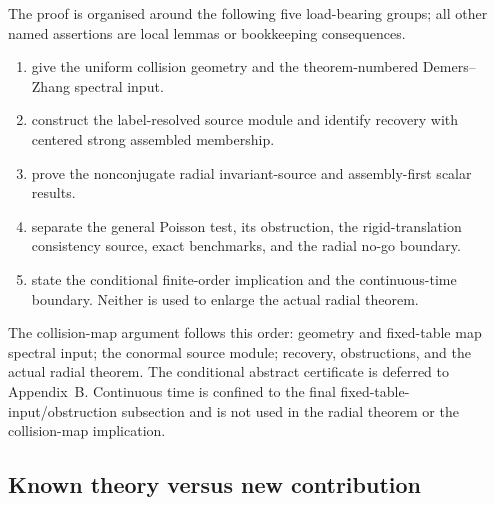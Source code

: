 \documentclass[11pt]{amsart}
\theoremstyle{compactplain}
\theoremstyle{compactdefinition}
\theoremstyle{compactremark}
\begin{document}
The proof is organised around the following five load-bearing groups;
all other named assertions are local lemmas or bookkeeping consequences.
\begin{enumerate}[label=\textup{\arabic*.},wide,labelindent=0pt]
  \item {}
  give the uniform collision geometry and the theorem-numbered
  Demers--Zhang spectral input.
  \item {}
  construct the label-resolved source module
  and identify recovery with centered strong assembled membership.
  \item {}
  prove the nonconjugate radial
  invariant-source and assembly-first scalar results.
  \item {}
  separate the general Poisson
  test, its obstruction, the rigid-translation consistency source, exact
  benchmarks, and the radial no-go boundary.
  \item {}
  state the conditional finite-order
  implication and the continuous-time boundary.  Neither is used to enlarge
  the actual radial theorem.
\end{enumerate}
The collision-map argument follows this order: geometry and fixed-table map
spectral input; the conormal source module; recovery, obstructions, and the
actual radial theorem.  The conditional abstract certificate is deferred to
Appendix~B.  Continuous time is confined to the final
fixed-table-input/obstruction subsection and is not used in the radial theorem
or the collision-map implication.

\subsection{Known theory versus new contribution}
\end{document}
